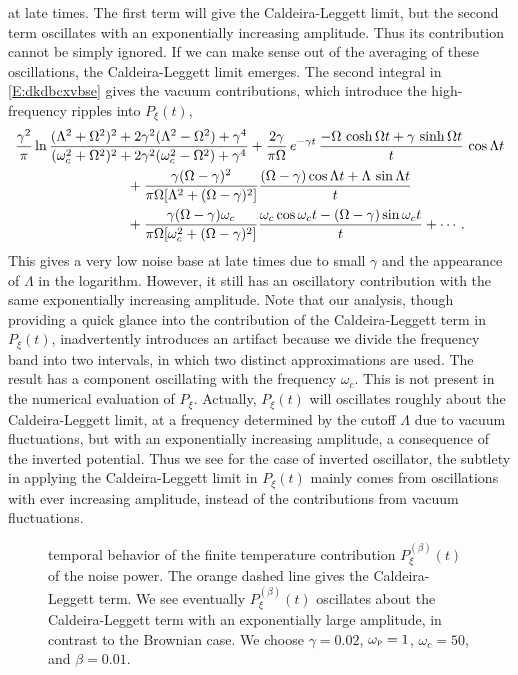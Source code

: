 \documentclass[11pt,a4paper]{article}
\begin{document}
at late times. The first term will give the Caldeira-Leggett limit, but the second term oscillates with an exponentially increasing amplitude. Thus its contribution cannot be simply ignored. If we can make sense out of the averaging of these oscillations, the Caldeira-Leggett limit emerges. The second integral in \eqref{E:dkdbcxvbse} gives the vacuum contributions, which introduce the high-frequency ripples into $P_{\xi}(t)$, 
\begin{align}
	&\frac{\gamma^{2}}{\pi}\ln\frac{(\Lambda^{2}+\Omega^{2})^{2}+2\gamma^{2}(\Lambda^{2}-\Omega^{2})+\gamma^{4}}{(\omega_{c}^{2}+\Omega^{2})^{2}+2\gamma^{2}(\omega_{c}^{2}-\Omega^{2})+\gamma^{4}}+\frac{2\gamma}{\pi\Omega}\,e^{-\gamma t}\,\frac{-\Omega\,\cosh\Omega t+\gamma\,\sinh\Omega t}{t}\,\cos\Lambda t\notag\\
	&\qquad\qquad\qquad\qquad+\frac{\gamma(\Omega-\gamma)^{2}}{\pi\Omega[\Lambda^{2}+(\Omega-\gamma)^{2}]}\frac{(\Omega-\gamma)\cos\Lambda t+\Lambda\,\sin\Lambda t}{t}\notag\\
	&\qquad\qquad\qquad\qquad+\frac{\gamma(\Omega-\gamma)\omega_{c}}{\pi\Omega[\omega_{c}^{2}+(\Omega-\gamma)^{2}]}\frac{\omega_{c}\cos\omega_{c} t-(\Omega-\gamma)\sin\omega_{c} t}{t}+\cdots\,.
\end{align}
This gives a very low noise base at late times due to small $\gamma$ and the appearance of $\Lambda$ in the logarithm. However, it still has an oscillatory contribution with the same exponentially increasing amplitude. Note that our analysis, though providing a quick glance into the contribution of the Caldeira-Leggett term in $P_{\xi}(t)$, inadvertently introduces an artifact because we divide the frequency band into two intervals, in which two distinct approximations are used. The result has a component oscillating with the frequency $\omega_{c}$. This {is} not present in the numerical evaluation of $P_{\xi}$. Actually, $P_{\xi}(t)$ will oscillates roughly about the Caldeira-Leggett limit, at a frequency determined by the cutoff $\Lambda$ due to vacuum fluctuations, but with an exponentially increasing amplitude, a consequence of  the inverted potential. Thus we see for the case of inverted oscillator, the subtlety in applying the Caldeira-Leggett limit in $P_{\xi}(t)$ mainly comes from oscillations with ever increasing amplitude, instead of the contributions from vacuum fluctuations.




\begin{figure}
\centering
    \caption{temporal behavior of the finite temperature contribution $P_{\xi}^{(\beta)}(t)$ of the noise power. The orange dashed line gives the Caldeira-Leggett term. We see eventually $P_{\xi}^{(\beta)}(t)$ oscillates about the Caldeira-Leggett term with an exponentially large amplitude, in contrast to the Brownian case. We choose $\gamma=0.02$, $\omega_{\textsc{p}}=1$, $\omega_{c}=50$, and $\beta=0.01$.}\label{Fi:CL_amp}
\end{figure}
\end{document}
